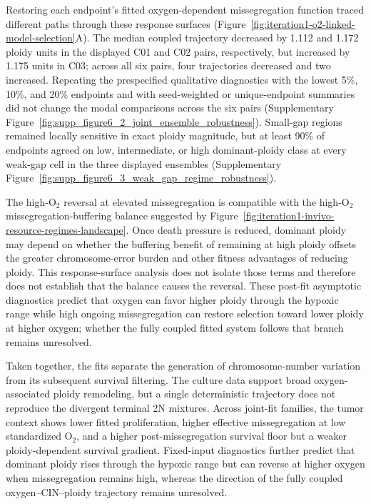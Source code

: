 \documentclass[11pt]{article}
\begin{document}
Restoring each endpoint's fitted oxygen-dependent missegregation function traced different paths through these response surfaces (Figure~\ref{fig:iteration1-o2-linked-model-selection}A). The median coupled trajectory decreased by 1.112 and 1.172 ploidy units in the displayed C01 and C02 pairs, respectively, but increased by 1.175 units in C03; across all six pairs, four trajectories decreased and two increased. Repeating the prespecified qualitative diagnostics with the lowest 5\%, 10\%, and 20\% endpoints and with seed-weighted or unique-endpoint summaries did not change the modal comparisons across the six pairs (Supplementary Figure~\ref{fig:supp_figure6_2_joint_ensemble_robustness}). Small-gap regions remained locally sensitive in exact ploidy magnitude, but at least 90\% of endpoints agreed on low, intermediate, or high dominant-ploidy class at every weak-gap cell in the three displayed ensembles (Supplementary Figure~\ref{fig:supp_figure6_3_weak_gap_regime_robustness}).

The high-O$_2$ reversal at elevated missegregation is compatible with the high-O$_2$ missegregation-buffering balance suggested by Figure~\ref{fig:iteration1-invivo-resource-regimes-landscape}. Once death pressure is reduced, dominant ploidy may depend on whether the buffering benefit of remaining at high ploidy offsets the greater chromosome-error burden and other fitness advantages of reducing ploidy. This response-surface analysis does not isolate those terms and therefore does not establish that the balance causes the reversal. These post-fit asymptotic diagnostics predict that oxygen can favor higher ploidy through the hypoxic range while high ongoing missegregation can restore selection toward lower ploidy at higher oxygen; whether the fully coupled fitted system follows that branch remains unresolved.

Taken together, the fits separate the generation of chromosome-number variation from its subsequent survival filtering. The culture data support broad oxygen-associated ploidy remodeling, but a single deterministic trajectory does not reproduce the divergent terminal 2N mixtures. Across joint-fit families, the tumor context shows lower fitted proliferation, higher effective missegregation at low standardized O$_2$, and a higher post-missegregation survival floor but a weaker ploidy-dependent survival gradient. Fixed-input diagnostics further predict that dominant ploidy rises through the hypoxic range but can reverse at higher oxygen when missegregation remains high, whereas the direction of the fully coupled oxygen--CIN--ploidy trajectory remains unresolved.
\end{document}
